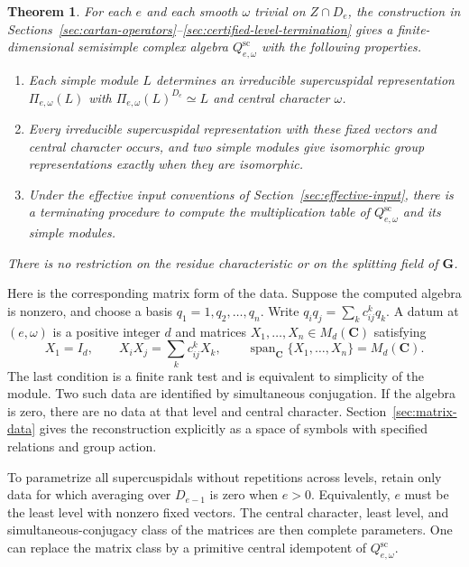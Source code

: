 \documentclass[10pt,letterpaper]{amsart}
\numberwithin{equation}{section}
\newtheorem{theorem}{Theorem}[section]
\theoremstyle{remark}
\newcommand{\C}{\mathbf C}
\begin{document}
\begin{theorem}\label{thm:main}
For each $e$ and each smooth $\omega$ trivial on $Z\cap D_e$, the construction
in Sections~\ref{sec:cartan-operators}--\ref{sec:certified-level-termination}
gives a finite-dimensional semisimple complex algebra
$Q^{\mathrm{sc}}_{e,\omega}$ with the following properties.
\begin{enumerate}
\item Each simple module $L$ determines an irreducible supercuspidal
representation $\Pi_{e,\omega}(L)$ with
$\Pi_{e,\omega}(L)^{D_e}\simeq L$ and central character $\omega$.
\item Every irreducible supercuspidal representation with these fixed vectors
and central character occurs, and two simple modules give isomorphic group
representations exactly when they are isomorphic.
\item Under the effective input conventions of
Section~\ref{sec:effective-input}, there is a terminating procedure to
compute the multiplication table of $Q^{\mathrm{sc}}_{e,\omega}$ and its
simple modules.
\end{enumerate}
There is no restriction on the residue characteristic or on the splitting
field of $\mathbf G$.
\end{theorem}

Here is the corresponding matrix form of the data. Suppose the computed
algebra is nonzero, and choose a basis $q_1=1,q_2,\ldots,q_n$. Write
$q_iq_j=\sum_k c_{ij}^kq_k$. A datum at $(e,\omega)$ is a positive integer
$d$ and matrices $X_1,\ldots,X_n\in M_d(\C)$ satisfying
\begin{equation}\label{eq:intro-matrix-data}
 X_1=I_d,\qquad X_iX_j=\sum_k c_{ij}^kX_k,\qquad
 \operatorname{span}_{\C}\{X_1,\ldots,X_n\}=M_d(\C).
\end{equation}
The last condition is a finite rank test and is equivalent to simplicity
of the module. Two such data are identified by simultaneous conjugation.
If the algebra is zero, there are no data at that level and central
character. Section~\ref{sec:matrix-data} gives the reconstruction explicitly
as a space of symbols with specified relations and group action.

To parametrize all supercuspidals without repetitions across levels, retain
only data for which averaging over $D_{e-1}$ is zero when $e>0$.
Equivalently, $e$ must be the least level with nonzero fixed vectors.
The central character, least level, and simultaneous-conjugacy class of the
matrices are then complete parameters. One can replace the matrix class by
a primitive central idempotent of $Q^{\mathrm{sc}}_{e,\omega}$.
\end{document}
